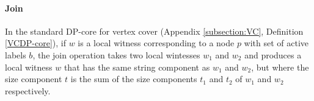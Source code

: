 



\paragraph*{Join}

In the standard DP-core for {\sc vertex cover} (Appendix \ref{subsection:VC}, Definition \ref{VCDP-core}), if $w$ is a local witness corresponding to a node $p$ with set of active labels $b$, the join operation takes two local wintesses $w_1$ and $w_2$ and produces a local witness $w$ that has the same string component as $w_1$ and $w_2$, but where the size component $t$ is the sum of the size components $t_1$ and $t_2$ of $w_1$ and $w_2$ respectively. 


